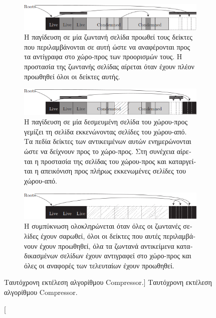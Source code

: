 \begin{greek}
\begin{figure}
  \begin{subfigure}[b]{1.0\textwidth}
    \includegraphics{figures/conc_2c}
    \caption
      {Η παγίδευση σε μία ζωντανή σελίδα προωθεί τους δείκτες
       που περιλαμβάνονται σε αυτή ώστε να αναφέρονται προς
       τα αντίγραφα στο χώρο-προς των προορισμών τους. Η προστασία
       της ζωντανής σελίδας αίρεται όταν έχουν πλέον προωθηθεί
       όλοι οι δείκτες αυτής.}
  \end{subfigure}
  
  \begin{subfigure}[b]{1.0\textwidth}
    \includegraphics{figures/conc_2d}
    \caption
      {Η παγίδευση σε μία δεσμευμένη σελίδα του χώρου-προς
       γεμίζει τη σελίδα εκκενώνοντας σελίδες του χώρου-από.
       Τα πεδία δείκτες των αντικειμένων αυτών ενημερώνονται
       ώστε να δείχνουν προς το χώρο-προς. Στη συνέχεια αίρεται
       η προστασία της σελίδας του χώρου-προς και καταργείται
       η απεικόνιση προς πλήρως εκκενωμένες σελίδες του
       χώρου-από.}
  \end{subfigure}
  
  \begin{subfigure}[b]{1.0\textwidth}
    \includegraphics{figures/conc_2e}
    \caption
      {Η συμπύκνωση ολοκληρώνεται όταν όλες οι ζωντανές
       σελίδες έχουν σαρωθεί, όλοι οι δείκτες που αυτές
       περιλαμβάνουν έχουν προωθηθεί, όλα τα ζωντανά
       αντικείμενα καταδικασμένων σελίδων έχουν αντιγραφεί
       στο χώρο-προς και όλες οι αναφορές των τελευταίων
       έχουν προωθηθεί.}
  \end{subfigure}    
  \caption
    [Ταυτόχρονη εκτέλεση αλγορίθμου Compressor.]
    {Ταυτόχρονη εκτέλεση αλγορίθμου Compressor.}
  \label{fig:conc_2}
\end{figure}


\end{greek}
